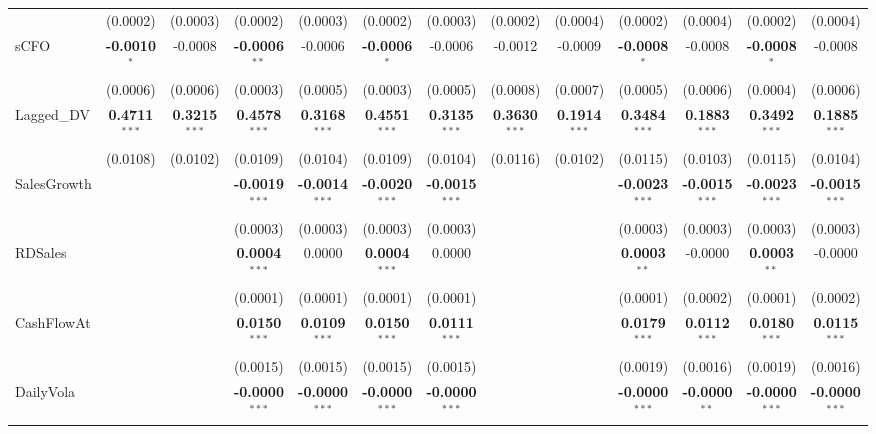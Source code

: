 \documentclass[11pt,a4paper]{article}
\begin{document}
\begin{table}[htbp]
\begin{tabular}{lcccccccccccc}
 & (0.0002) & (0.0003) & (0.0002) & (0.0003) & (0.0002) & (0.0003) & (0.0002) & (0.0004) & (0.0002) & (0.0004) & (0.0002) & (0.0004) \\
sCFO & \textbf{-0.0010}$^{*}$ & -0.0008 & \textbf{-0.0006}$^{**}$ & -0.0006 & \textbf{-0.0006}$^{*}$ & -0.0006 & -0.0012 & -0.0009 & \textbf{-0.0008}$^{*}$ & -0.0008 & \textbf{-0.0008}$^{*}$ & -0.0008 \\
 & (0.0006) & (0.0006) & (0.0003) & (0.0005) & (0.0003) & (0.0005) & (0.0008) & (0.0007) & (0.0005) & (0.0006) & (0.0004) & (0.0006) \\
Lagged\_DV & \textbf{0.4711}$^{***}$ & \textbf{0.3215}$^{***}$ & \textbf{0.4578}$^{***}$ & \textbf{0.3168}$^{***}$ & \textbf{0.4551}$^{***}$ & \textbf{0.3135}$^{***}$ & \textbf{0.3630}$^{***}$ & \textbf{0.1914}$^{***}$ & \textbf{0.3484}$^{***}$ & \textbf{0.1883}$^{***}$ & \textbf{0.3492}$^{***}$ & \textbf{0.1885}$^{***}$ \\
 & (0.0108) & (0.0102) & (0.0109) & (0.0104) & (0.0109) & (0.0104) & (0.0116) & (0.0102) & (0.0115) & (0.0103) & (0.0115) & (0.0104) \\
SalesGrowth &  &  & \textbf{-0.0019}$^{***}$ & \textbf{-0.0014}$^{***}$ & \textbf{-0.0020}$^{***}$ & \textbf{-0.0015}$^{***}$ &  &  & \textbf{-0.0023}$^{***}$ & \textbf{-0.0015}$^{***}$ & \textbf{-0.0023}$^{***}$ & \textbf{-0.0015}$^{***}$ \\
 &  &  & (0.0003) & (0.0003) & (0.0003) & (0.0003) &  &  & (0.0003) & (0.0003) & (0.0003) & (0.0003) \\
RDSales &  &  & \textbf{0.0004}$^{***}$ & 0.0000 & \textbf{0.0004}$^{***}$ & 0.0000 &  &  & \textbf{0.0003}$^{**}$ & -0.0000 & \textbf{0.0003}$^{**}$ & -0.0000 \\
 &  &  & (0.0001) & (0.0001) & (0.0001) & (0.0001) &  &  & (0.0001) & (0.0002) & (0.0001) & (0.0002) \\
CashFlowAt &  &  & \textbf{0.0150}$^{***}$ & \textbf{0.0109}$^{***}$ & \textbf{0.0150}$^{***}$ & \textbf{0.0111}$^{***}$ &  &  & \textbf{0.0179}$^{***}$ & \textbf{0.0112}$^{***}$ & \textbf{0.0180}$^{***}$ & \textbf{0.0115}$^{***}$ \\
 &  &  & (0.0015) & (0.0015) & (0.0015) & (0.0015) &  &  & (0.0019) & (0.0016) & (0.0019) & (0.0016) \\
DailyVola &  &  & \textbf{-0.0000}$^{***}$ & \textbf{-0.0000}$^{***}$ & \textbf{-0.0000}$^{***}$ & \textbf{-0.0000}$^{***}$ &  &  & \textbf{-0.0000}$^{***}$ & \textbf{-0.0000}$^{**}$ & \textbf{-0.0000}$^{***}$ & \textbf{-0.0000}$^{***}$ \\

\end{tabular}
\end{table}
\end{document}
